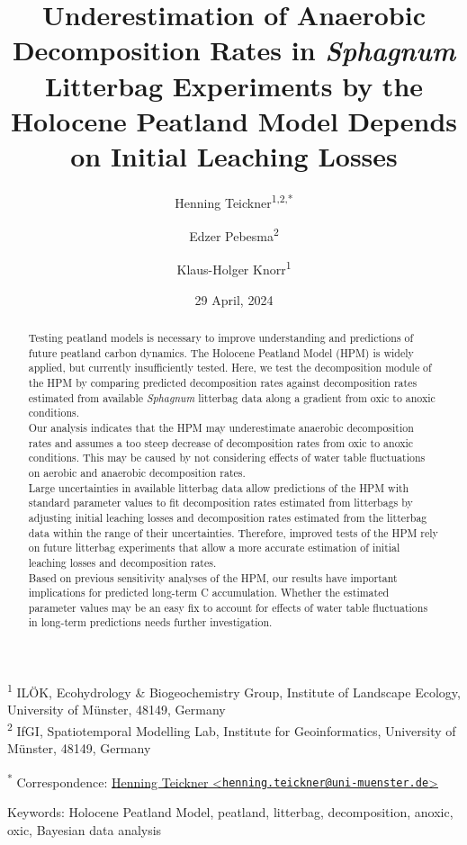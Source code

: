 \documentclass[
  12pt,
]{article}
\title{Underestimation of Anaerobic Decomposition Rates in \emph{Sphagnum} Litterbag Experiments by the Holocene Peatland Model Depends on Initial Leaching Losses}
\author{Henning Teickner\textsuperscript{1,2,*} \and Edzer Pebesma\textsuperscript{2} \and Klaus-Holger Knorr\textsuperscript{1}}
\date{29 April, 2024}
\begin{document}
\maketitle
\begin{abstract}
Testing peatland models is necessary to improve understanding and predictions of future peatland carbon dynamics. The Holocene Peatland Model (HPM) is widely applied, but currently insufficiently tested. Here, we test the decomposition module of the HPM by comparing predicted decomposition rates against decomposition rates estimated from available \emph{Sphagnum} litterbag data along a gradient from oxic to anoxic conditions.\\
Our analysis indicates that the HPM may underestimate anaerobic decomposition rates and assumes a too steep decrease of decomposition rates from oxic to anoxic conditions. This may be caused by not considering effects of water table fluctuations on aerobic and anaerobic decomposition rates.\\
Large uncertainties in available litterbag data allow predictions of the HPM with standard parameter values to fit decomposition rates estimated from litterbags by adjusting initial leaching losses and decomposition rates estimated from the litterbag data within the range of their uncertainties. Therefore, improved tests of the HPM rely on future litterbag experiments that allow a more accurate estimation of initial leaching losses and decomposition rates.
\\
Based on previous sensitivity analyses of the HPM, our results have important implications for predicted long-term C accumulation. Whether the estimated parameter values may be an easy fix to account for effects of water table fluctuations in long-term predictions needs further investigation.
\end{abstract}

\textsuperscript{1} ILÖK, Ecohydrology \& Biogeochemistry Group, Institute of Landscape Ecology, University of Münster, 48149, Germany\\
\textsuperscript{2} IfGI, Spatiotemporal Modelling Lab, Institute for Geoinformatics, University of Münster, 48149, Germany

\textsuperscript{*} Correspondence: \href{mailto:henning.teickner@uni-muenster.de}{Henning Teickner \textless{}\href{mailto:henning.teickner@uni-muenster.de}{\nolinkurl{henning.teickner@uni-muenster.de}}\textgreater{}}

Keywords: Holocene Peatland Model, peatland, litterbag, decomposition, anoxic, oxic, Bayesian data analysis
\end{document}
